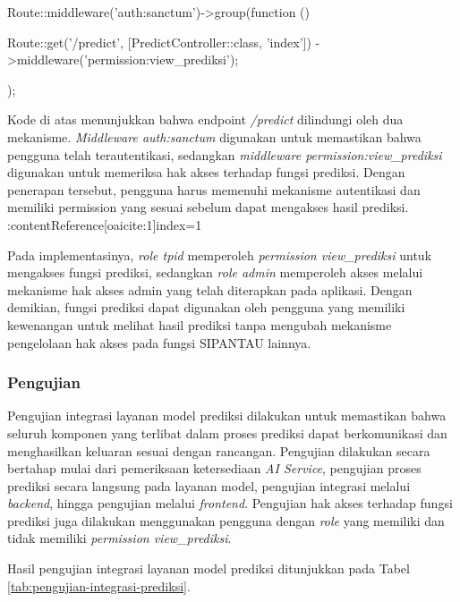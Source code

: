 \begin{code}
\begin{ignasicblock}
Route::middleware('auth:sanctum')->group(function () {

    Route::get('/predict', [PredictController::class, 'index'])
        ->middleware('permission:view_prediksi');

});
\end{ignasicblock}
\end{code}

Kode di atas menunjukkan bahwa endpoint \textit{/predict} dilindungi oleh dua mekanisme. \textit{Middleware auth:sanctum} digunakan untuk memastikan bahwa pengguna telah terautentikasi, sedangkan \textit{middleware permission:view\_prediksi} digunakan untuk memeriksa hak akses terhadap fungsi prediksi. Dengan penerapan tersebut, pengguna harus memenuhi mekanisme autentikasi dan memiliki permission yang sesuai sebelum dapat mengakses hasil prediksi. :contentReference[oaicite:1]{index=1}

Pada implementasinya, \textit{role tpid} memperoleh \textit{permission view\_prediksi} untuk mengakses fungsi prediksi, sedangkan \textit{role admin} memperoleh akses melalui mekanisme hak akses admin yang telah diterapkan pada aplikasi. Dengan demikian, fungsi prediksi dapat digunakan oleh pengguna yang memiliki kewenangan untuk melihat hasil prediksi tanpa mengubah mekanisme pengelolaan hak akses pada fungsi SIPANTAU lainnya.

\subsubsection{Pengujian}

Pengujian integrasi layanan model prediksi dilakukan untuk memastikan bahwa seluruh komponen yang terlibat dalam proses prediksi dapat berkomunikasi dan menghasilkan keluaran sesuai dengan rancangan. Pengujian dilakukan secara bertahap mulai dari pemeriksaan ketersediaan \textit{AI Service}, pengujian proses prediksi secara langsung pada layanan model, pengujian integrasi melalui \textit{backend}, hingga pengujian melalui \textit{frontend}. Pengujian hak akses terhadap fungsi prediksi juga dilakukan menggunakan pengguna dengan \textit{role} yang memiliki dan tidak memiliki \textit{permission view\_prediksi}.

Hasil pengujian integrasi layanan model prediksi ditunjukkan pada Tabel \ref{tab:pengujian-integrasi-prediksi}.

